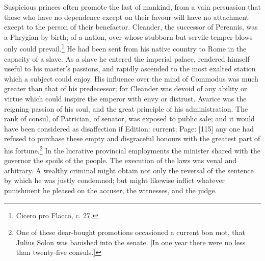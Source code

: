 Suspicious princes often promote the last of mankind, from a vain persuasion that those who have no dependence except on their favour will have no attachment except to the person of their benefactor. Cleander, the successor of Perennis, was a Phrygian by birth; of a nation, over whose stubborn but servile temper blows only could prevail.\footnote{Cicero pro Flacco, c. 27.} He had been sent from his native country to Rome in the capacity of a slave. As a slave he entered the imperial palace, rendered himself useful to his master\texthebrew{}’s passions, and rapidly ascended to the most exalted station which a subject could enjoy. His influence over the mind of Commodus was much greater than that of his predecessor; for Cleander was devoid of any ability or virtue which could inspire the emperor with envy or distrust. Avarice was the reigning passion of his soul, and the great principle of his administration. The rank of consul, of Patrician, of senator, was exposed to public sale; and it would have been considered as disaffection if Edition: current; Page: [115] any one had refused to purchase these empty and disgraceful honours with the greatest part of his fortune.\footnote{One of these dear-bought promotions occasioned a current bon mot, that Julius Solon was banished into the senate. [In one year there were no less than twenty-five consuls.]} In the lucrative provincial employments the minister shared with the governor the spoils of the people. The execution of the laws was venal and arbitrary. A wealthy criminal might obtain not only the reversal of the sentence by which he was justly condemned; but might likewise inflict whatever punishment he pleased on the accuser, the witnesses, and the judge.

